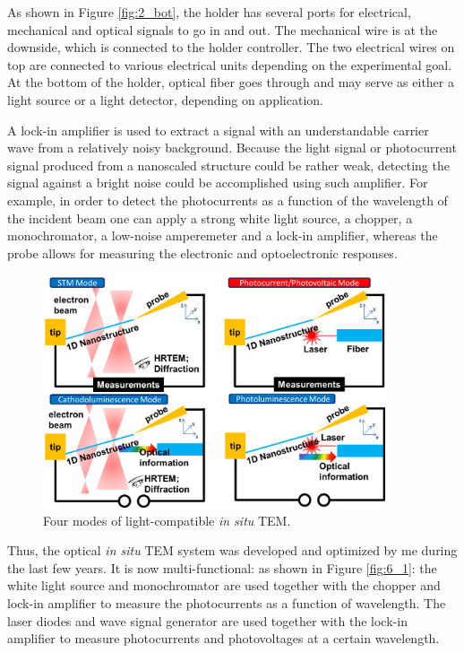 As shown in Figure \ref{fig:2_bot}, the holder has several ports for electrical, mechanical and optical signals to go in and out. 
The mechanical wire is at the downside, which is connected to the holder controller. 
The two electrical wires on top are connected to various electrical units depending on the experimental goal. 
At the bottom of the holder, optical fiber goes through and may serve as either a light source or a light detector, depending on application. 

A lock-in amplifier is used to extract a signal with an understandable carrier wave from a relatively noisy background. 
Because the light signal or photocurrent signal produced from a nanoscaled structure could be rather weak, detecting the signal against a bright noise could be accomplished using such amplifier. 
For example, in order to detect the photocurrents as a function of the wavelength of the incident beam one can apply a strong white light source, a chopper, a monochromator, a low-noise amperemeter and a lock-in amplifier, whereas the probe allows for measuring the electronic and optoelectronic responses. 

\begin{figure}  
\centering
\includegraphics[width=0.9\textwidth]{figures/figure2_fourmodes}
\caption[Four modes]{Four modes of light-compatible {\em in situ} TEM.
\label{fig:2_fourmodes}}
\end{figure}

Thus, the optical {\em in situ} TEM system was developed and optimized by me during the last few years. It is now multi-functional: 
as shown in Figure \ref{fig:6_1}: the white light source and monochromator are used together with the chopper and lock-in amplifier to measure the photocurrents as a function of wavelength. The laser diodes and wave signal generator are used together with the lock-in amplifier to measure photocurrents and photovoltages at a certain wavelength. 

